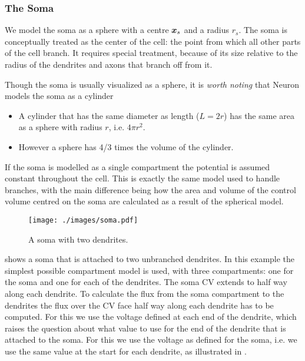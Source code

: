 \subsubsection{The Soma}
We model the soma as a sphere with a centre $\bm{x}_s$ and a radius $r_s$.
The soma is conceptually treated as the center of the cell: the point from which all other parts of the cell branch.
It requires special treatment, because of its size relative to the radius of the dendrites and axons that branch off from it.

Though the soma is usually visualized as a sphere, it is \emph{worth noting} that Neuron models the soma as a cylinder
\begin{itemize}
    \item A cylinder that has the same diameter as length ($L=2r$) has the same area as a sphere with radius $r$, i.e. $4\pi r^2$.
    \item However a sphere has 4/3 times the volume of the cylinder.
\end{itemize}

If the soma is modelled as a single compartment the potential is assumed constant throughout the cell.
This is exactly the same model used to handle branches, with the main difference being how the area and volume of the control volume centred on the soma are calculated as a result of the spherical model.

\begin{figure}
    \begin{center}
        \texttt{[image: ./images/soma.pdf]}
    \end{center}
    \caption{A soma with two dendrites.}
    \label{fig:soma}
\end{figure}

 shows a soma that is attached to two unbranched dendrites.
In this example the simplest possible compartment model is used, with three compartments: one for the soma and one for each of the dendrites.
The soma CV extends to half way along each dendrite.
To calculate the flux from the soma compartment to the dendrites the flux over the CV face half way along each dendrite has to be computed.
For this we use the voltage defined at each end of the dendrite, which raises the question about what value to use for the end of the dendrite that is attached to the soma.
For this we use the voltage as defined for the soma, i.e. we use the same value at the start for each dendrite, as illustrated in .


